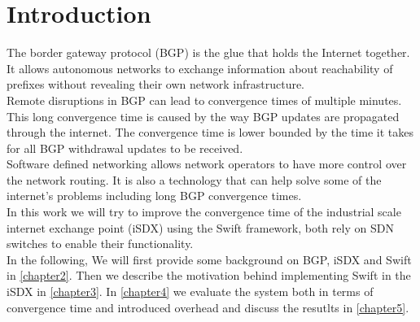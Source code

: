 

\chapter{\label{introduction}Introduction}
The border gateway protocol (BGP) is the glue that holds the Internet together. It allows autonomous networks to exchange information about reachability of prefixes without revealing their own network infrastructure. \\
Remote disruptions in BGP can lead to convergence times of multiple minutes. This long convergence time is caused by the way BGP updates are propagated through the internet. The convergence time is lower bounded by the time it takes for all BGP withdrawal updates to be received. \\
Software defined networking allows network operators to have more control over the network routing. It is also a technology that can help solve some of the internet's problems including long BGP convergence times. \\
In this work we will try to improve the convergence time of the industrial scale internet exchange point (iSDX) using the Swift framework, both rely on SDN switches to enable their functionality. \\
In the following, We will first provide some background on BGP, iSDX and Swift in \ref{chapter2}. Then we describe the motivation behind implementing Swift in the iSDX in \ref{chapter3}. In \ref{chapter4} we evaluate the system both in terms of convergence time and introduced overhead and discuss the resutlts in \ref{chapter5}. 



